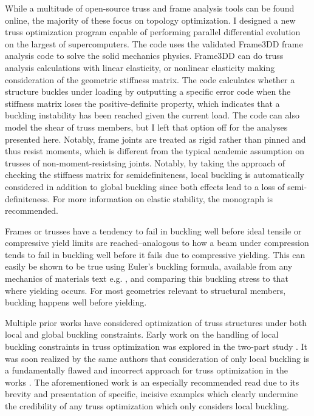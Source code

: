 \documentclass{report}
\begin{document}
While a multitude of open-source truss and frame analysis tools can be found online,
the majority of these focus on topology optimization. I designed a new truss optimization
program capable of performing parallel differential evolution on the largest of supercomputers.
The code uses the validated Frame3DD frame analysis code \cite{gavinUserManualReference}
to solve the solid mechanics physics. Frame3DD can do truss analysis calculations with linear elasticity,
or nonlinear elasticity making consideration of the geometric stiffness matrix. The code calculates whether
a structure buckles under loading by outputting a specific error code when the stiffness
matrix loses the positive-definite property, which indicates that a buckling instability has been reached
given the current load. The code can also model the shear of truss members, but I left that
option off for the analyses presented here. Notably, frame joints are treated as rigid rather than
pinned and thus resist moments, which is different from the typical academic assumption on
trusses of non-moment-resistsing joints. Notably, by taking the approach of checking the stiffness
matrix for semidefiniteness, local buckling is automatically considered in addition to global
buckling since both effects lead to a loss of semi-definiteness. For more information on
elastic stability, the monograph \cite{timoshenkoTheoryElasticStability2009} is recommended.

Frames or trusses have a tendency to fail in buckling well before ideal
tensile or compressive yield limits are reached--analogous to how a beam
under compression tends to fail in buckling well before it fails due to
compressive yielding. This can easily be shown to be true using Euler's
buckling formula, available from any mechanics of materials text e.g. \cite{gereMechanicsMaterials1996}, and
comparing this buckling stress to that where yielding occurs. For most
geometries relevant to structural members, buckling happens well before
yielding.

Multiple prior works have considered optimization of truss structures under both local
and global buckling constraints. Early work on the handling of local buckling constraints
in truss optimization was explored in the two-part study \cite{zhouDCOCOptimalityCriteria1992}.
It was soon realized by the same authors that consideration of only local buckling is a
fundamentally flawed and incorrect approach for truss optimization in the works \cite{zhouDifficultiesTrussTopology1996,rozvanyDifficultiesTrussTopology1996}.
The aforementioned work \cite{zhouDifficultiesTrussTopology1996} is an especially recommended
read due to its brevity and presentation of specific, incisive examples which clearly undermine the
credibility of any truss optimization which only considers local buckling.
\end{document}
